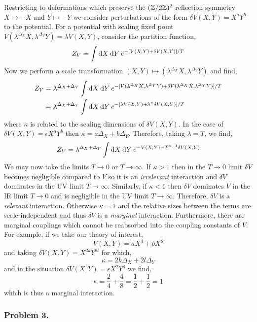 \documentclass[12pt]{article}
\begin{document}
Restricting to deformations which preserve the $(\mathbb{Z} / 2 \mathbb{Z})^2$ reflection symmetry $X \mapsto - X$ and $Y \mapsto - Y$ we consider perturbations of the form $\delta V(X, Y) = X^a Y^b$ to the potential. For a potential with scaling fixed point $V(\lambda^{\Delta_X} X, \lambda^{\Delta_Y} Y) = \lambda V(X,Y)$, consider the partition function,
\begin{align*}
Z_V = \int \mathrm{d}X \: \mathrm{d}Y \: e^{ - [V(X, Y) + \delta V(X, Y)] / T}  
\end{align*}
Now we perform a scale transformation $(X, Y) \mapsto (\lambda^{\Delta_X} X, \lambda^{\Delta_Y} Y)$ and find,
\begin{align*}
Z_V & = \lambda^{\Delta_X + \Delta_Y} \int \mathrm{d}X \: \mathrm{d}Y \: e^{ - [V(\lambda^{\Delta_X} X, \lambda^{\Delta_Y} Y) + \delta V(\lambda^{\Delta_X} X, \lambda^{\Delta_Y} Y)] / T} 
\\
& = \lambda^{\Delta_X + \Delta_Y} \int \mathrm{d}X \: \mathrm{d}Y \: e^{ - [\lambda V(X, Y) + \lambda^\kappa \delta V(X, Y)] / T} 
\end{align*}
where $\kappa$ is related to the scaling dimensions of $\delta V(X, Y)$. In the case of $\delta V(X,Y) = \epsilon X^a Y^b$ then $\kappa = a \Delta_X + b \Delta_Y$. Therefore, taking $\lambda = T$, we find,
\begin{align*}
Z_V = \lambda^{\Delta_X + \Delta_Y} \int \mathrm{d}X \: \mathrm{d}Y \: e^{ - V(X, Y) - T^{\kappa-1} \delta V(X, Y)}
\end{align*}
We may now take the limits $T \to 0$ or $T \to \infty$. If $\kappa > 1$ then in the $T \to 0$ limit $\delta V$ becomes negligible compared to $V$ so it is an \textit{irrelevant} interaction and $\delta V$ dominates in the UV limit $T \to \infty$. Similarly, if $\kappa < 1$ then $\delta V$ dominates $V$ in the IR limit $T \to 0$ and is negligible in the UV limit $T \to \infty$. Therefore, $\delta V$ is a \textit{relevant} interaction. Otherwise $\kappa = 1$ and the relative sizes between the terms are scale-independent and thus $\delta V$ is a \textit{marginal} interaction. Furthermore, there are marginal couplings which cannot be reabsorbed into the coupling constants of $V$. For example, if we take our theory of interest,
\[ V(X,Y) = a X^4 + b X^8 \] 
and taking $\delta V(X, Y) = X^{2k } Y^{2l}$ for which,
\[ \kappa = 2 k \Delta_X + 2 l \Delta_Y \]
and in the situation $\delta V(X, Y) = \epsilon X^2 Y^4$ we find,
\[ \kappa = \frac{2}{4} + \frac{4}{8} = \frac{1}{2} + \frac{1}{2} = 1 \]
which is thus a marginal interaction. 


\subsubsection{Problem 3.}
\end{document}
